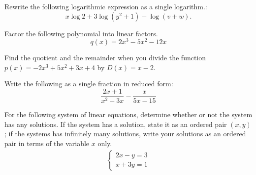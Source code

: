 \begin{questions}
    \question[4] %
    Rewrite the following logarithmic expression as a single logarithm.:
    \[x\log 2+3\log (y^2+1)-\log (v+w).\]
\newpage




\question[5] Factor the following polynomial into linear factors.
\[ q(x)= 2x^3-5x^2-12x\]

\vspace{3cm}




\question[6] Find the quotient and the remainder when you divide the function \\
$p(x)=-2x^3+5x^2+3x+4$ by $D(x)=x-2$.

\newpage 

\question[5] Write the following as a single fraction in reduced form:
$$ \dfrac{2x+1}{x^2-3x}-\dfrac{x}{5x-15}$$
\vspace{6cm}

\question[6] %
For the following system of linear equations, determine whether or not the system has any solutions. If the system has a solution, state it as an ordered pair $(x,y)$; if the systems has infinitely many solutions, write your solutions as an ordered pair in terms of the variable $x$ only.
\begin{align*}
    \begin{cases}
        2 x  -   y = 3 \\
        x  +  3y = 1
    \end{cases}
\end{align*}
\vfill
\newpage


\end{questions}
